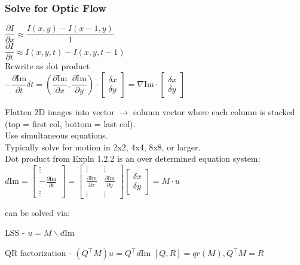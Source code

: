 \documentclass{article}
\begin{document}
\subsubsection{Solve for Optic Flow}
\begin{expln}
{}{}
$
\dfrac{\partial I}{\partial x} \approx \dfrac{I(x,y) - I(x-1, y)}{1}
$\\[5pt]
$
\dfrac{\partial I}{\partial t} \approx I(x,y, t) - I(x, y, t-1)
$
\\[5pt]
Rewrite as dot product \\[5pt]
$
-\dfrac{\partial \mathrm{Im}}{\partial t} \delta t = \left ( 
\dfrac{\partial \mathrm{Im}}{\partial x}, \dfrac{\partial \mathrm{Im} }{\partial y}
\right )
\cdot \begin{bmatrix}
    \delta x \\ \delta y
\end{bmatrix}
= \nabla \mathrm{Im} \cdot \begin{bmatrix}
    \delta x \\ \delta y
\end{bmatrix}
$

\end{expln}
Flatten 2D images into vector $\to$ column vector where each column 
is stacked (top = first col, bottom = last col).\\
Use simultaneous equations.
\\
Typically solve for motion in 2x2, 4x4, 8x8, or larger. \\
Dot product from Expln 1.2.2 is an over determined equation system; \\
\begin{math}
    d\mathrm{Im} = \begin{bmatrix}
        \vdots \\ -\frac{\partial \mathrm{Im}}{\partial t} \\ \vdots
    \end{bmatrix} =
    \begin{bmatrix}
        \vdots & \vdots \\ \frac{\partial \mathrm{Im}}{\partial x} & \frac{\partial \mathrm{Im}}{\partial y} \\ \vdots & \vdots
    \end{bmatrix} \begin{bmatrix}
        \delta x \\ \delta y
    \end{bmatrix} = M \cdot u
\end{math}

can be solved via:
\begin{list}{}{}
    \item LSS - $u = M \backslash d\mathrm{Im}$
    \item QR factorization - $(Q^\top M)u = Q^\top d\mathrm{Im}$    $[Q,R] = qr(M), Q^\top M = R$
\end{list}
\end{document}
